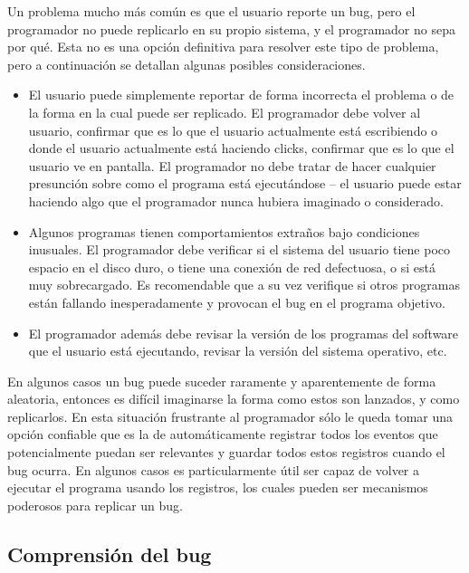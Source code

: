 \documentclass[12pt,legalpaper]{report}
\begin{document}
Un problema mucho más común es que el usuario reporte un bug, pero el programador no puede replicarlo en su propio sistema, y el programador no sepa por qué.  Esta no es una opción definitiva para resolver este tipo de problema, pero a continuación se detallan algunas posibles consideraciones.

\begin{itemize}
	\item El usuario puede simplemente reportar de forma incorrecta el problema o de la forma en la cual puede ser replicado.  El programador debe volver al usuario, confirmar que es lo que el usuario actualmente está escribiendo o donde el usuario actualmente está haciendo clicks, confirmar que es lo que el usuario ve en pantalla.  El programador no debe tratar de hacer cualquier presunción sobre como el programa está ejecutándose -- el usuario puede estar haciendo algo que el programador nunca hubiera imaginado o considerado.

    \item Algunos programas tienen comportamientos extraños bajo condiciones inusuales.  El programador debe verificar si el sistema del usuario tiene poco espacio en el disco duro, o tiene una conexión de red defectuosa, o si está muy sobrecargado.  Es recomendable que a su vez verifique si otros programas están fallando inesperadamente y provocan el bug en el programa objetivo.

    \item El programador además debe revisar la versión de los programas del software que el usuario está ejecutando, revisar la versión del sistema operativo, etc.
\end{itemize}

En algunos casos un bug puede suceder raramente y aparentemente de forma aleatoria, entonces es difícil imaginarse la forma como estos son lanzados, y como replicarlos.  En esta situación frustrante al programador sólo le queda tomar una opción confiable que es la de automáticamente registrar todos los eventos que potencialmente puedan ser relevantes y guardar todos estos registros cuando el bug ocurra.  En algunos casos es particularmente útil ser capaz de volver a ejecutar el programa usando los registros, los cuales pueden ser mecanismos poderosos para replicar un bug.


\subsection{Comprensión del bug}
\end{document}
